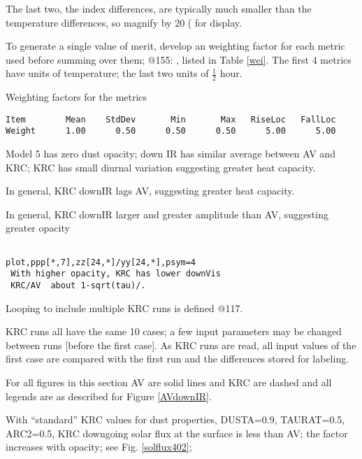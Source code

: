 \documentclass{article}
\begin{document}
The last two, the index differences, are typically much smaller than the temperature differences, so magnify by 20 ( for display.

To generate a single value of merit, develop an weighting factor for each metric used before summing over them; @155: , listed in Table \ref{wei}.
 The first 4 metrics have units of temperature; the last two units of $\frac{1}{2}$ hour.


\begin{table} \caption[Metric weights]{Weighting factors for the metrics}  \label{wei}
\begin{verbatim}
Item        Mean    StdDev       Min       Max   RiseLoc   FallLoc
Weight      1.00      0.50      0.50      0.50      5.00      5.00
\end{verbatim}
\vspace{-3.0mm}
\hrulefill \end{table}  
 
Model 5 has zero dust opacity; down IR has similar average between AV and KRC;
KRC has small diurnal variation suggesting greater heat capacity.

In general, KRC downIR lags AV, suggesting greater heat capacity.

In general, KRC downIR larger and greater amplitude than AV, 
  suggesting greater opacity
\vspace{-3.mm} 
\begin{verbatim}

plot,ppp[*,7],zz[24,*]/yy[24,*],psym=4
 With higher opacity, KRC has lower downVis
 KRC/AV  about 1-sqrt(tau)/.
\end{verbatim}  

Looping to include multiple KRC runs is defined @117.

KRC runs all have the same 10 cases; a few input parameters may be changed between runs [before the first case]. As KRC runs are read, all input values of the first case are compared with the first run and the differences stored for labeling.  


 For all figures in this section AV are solid lines and KRC are dashed and all legends are as described for Figure \ref{AVdownIR}.

With ``standard'' KRC values for dust properties, DUSTA=0.9, TAURAT=0.5,  ARC2=0.5, KRC downgoing solar flux at the surface is less than AV; the factor increases with opacity; see Fig. \ref{solflux402}; 
\end{document}
